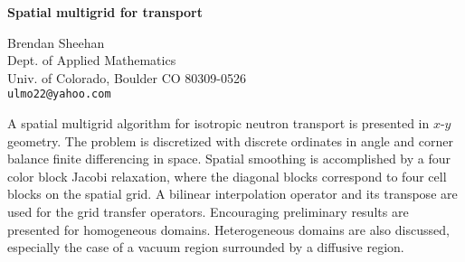 \documentclass{report}
\begin{document}

\begin{center}
{\large
{\bf Spatial multigrid for transport}}

	Brendan Sheehan \\
	Dept. of Applied Mathematics \\
	Univ. of Colorado, Boulder CO 80309-0526 \\
	{\tt ulmo22@yahoo.com}
\end{center}
A spatial multigrid algorithm for isotropic neutron
transport is presented in $x$-$y$ geometry. The problem is
discretized with discrete ordinates in angle and corner
balance finite differencing in space. Spatial smoothing is
accomplished by a four color block Jacobi relaxation, where
the diagonal blocks correspond to four cell blocks on the
spatial grid. A bilinear interpolation operator and its
transpose are used for the grid transfer operators.
Encouraging preliminary results are presented for
homogeneous domains. Heterogeneous domains are also
discussed, especially the case of a vacuum region surrounded
by a diffusive region.



\end{document}
